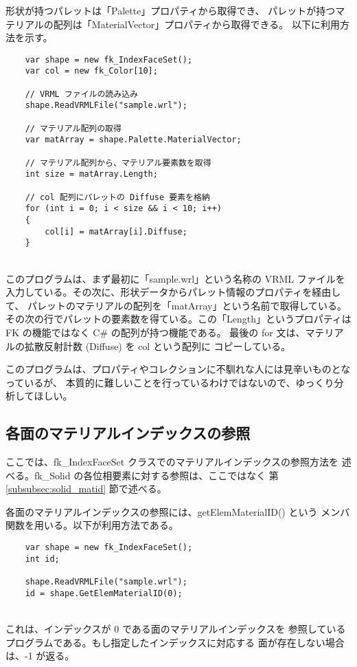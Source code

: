 形状が持つパレットは「Palette」プロパティから取得でき、
パレットが持つマテリアルの配列は「MaterialVector」プロパティから取得できる。
以下に利用方法を示す。
\\
\begin{breakbox}
\begin{verbatim}
    var shape = new fk_IndexFaceSet();
    var col = new fk_Color[10];

    // VRML ファイルの読み込み
    shape.ReadVRMLFile("sample.wrl");

    // マテリアル配列の取得
    var matArray = shape.Palette.MaterialVector;

    // マテリアル配列から、マテリアル要素数を取得
    int size = matArray.Length;

    // col 配列にパレットの Diffuse 要素を格納
    for (int i = 0; i < size && i < 10; i++)
    {
        col[i] = matArray[i].Diffuse;
    }
\end{verbatim}
\end{breakbox}
~ \\
このプログラムは、まず最初に「sample.wrl」という名称の VRML ファイルを
入力している。その次に、形状データからパレット情報のプロパティを経由して、
パレットのマテリアルの配列を「matArray」という名前で取得している。
その次の行でパレットの要素数を得ている。この「Length」というプロパティは
FK の機能ではなく C\# の配列が持つ機能である。
最後の for 文は、マテリアルの拡散反射計数 (Diffuse) を col という配列に
コピーしている。

このプログラムは、プロパティやコレクションに不馴れな人には見辛いものとなっているが、
本質的に難しいことを行っているわけではないので、ゆっくり分析してほしい。

\subsection{各面のマテリアルインデックスの参照}
ここでは、fk\_IndexFaceSet クラスでのマテリアルインデックスの参照方法を
述べる。fk\_Solid の各位相要素に対する参照は、ここではなく
第 \ref{subsubsec:solid_matid} 節で述べる。

各面のマテリアルインデックスの参照には、getElemMaterialID() という
メンバ関数を用いる。以下が利用方法である。
\\
\begin{breakbox}
\begin{verbatim}
    var shape = new fk_IndexFaceSet();
    int id;

    shape.ReadVRMLFile("sample.wrl");
    id = shape.GetElemMaterialID(0);
\end{verbatim}
\end{breakbox}
~ \\
これは、インデックスが 0 である面のマテリアルインデックスを
参照しているプログラムである。もし指定したインデックスに対応する
面が存在しない場合は、-1 が返る。

